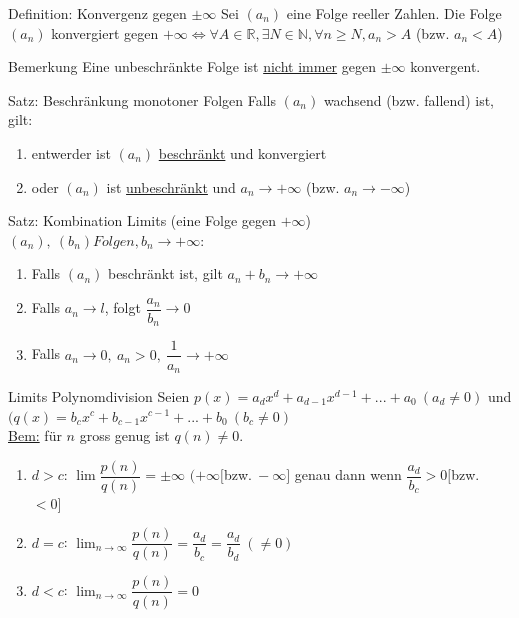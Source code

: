 \documentclass[a4paper,10pt]{article}
\begin{document}
\begin{defbox}
    {Definition: Konvergenz gegen $\pm\infty$}
    Sei $(a_n)$ eine Folge reeller Zahlen. Die Folge $(a_n)$ konvergiert gegen $+\infty \iff \forall A\in \mathbb R, \exists N \in \mathbb N, \forall n \ge N, a_n > A$ (bzw. $a_n<A$)
\end{defbox}
\begin{bembox}
    {Bemerkung}
    Eine unbeschränkte Folge ist \underline{nicht immer} gegen $\pm\infty$ konvergent.
\end{bembox}
\begin{tbox}
    {Satz: Beschränkung monotoner Folgen}
    Falls $(a_n)$ wachsend (bzw. fallend) ist, gilt:
    \begin{enumerate}
        \item entwerder ist $(a_n)$ \underline{beschränkt} und konvergiert
        \item oder $(a_n)$ ist \underline{unbeschränkt} und $a_n\longrightarrow+\infty$ (bzw. $a_n\longrightarrow -\infty$)
    \end{enumerate}
\end{tbox}
\begin{tbox}
    {Satz: Kombination Limits (eine Folge gegen $+\infty$)}
    $(a_n),\ (b_n) Folgen, b_n \longrightarrow+\infty:$
    \begin{enumerate}
        \item Falls $(a_n)$ beschränkt ist, gilt $a_n+ b_n \longrightarrow+\infty$
        \item Falls $a_n\longrightarrow l$, folgt $\dfrac{a_n}{b_n}\longrightarrow 0$
        \item Falls $a_n\longrightarrow 0, \ a_n >0, \ \dfrac{1}{a_n}\longrightarrow +\infty$
    \end{enumerate}
\end{tbox}
\begin{tipbox}
    {Limits Polynomdivision}
    Seien $p(x)=a_dx^d+a_{d-1}x^{d-1}+...+a_0\ (a_d\neq 0)$ und $(q(x)=b_cx^c+b_{c-1}x^{c-1}+...+b_0\ (b_c\neq 0)$ 
    \\\underline{Bem:} für $n$ gross genug ist $q(n)\neq 0$.
    \begin{enumerate}
        \item $d>c$: $\lim \dfrac{p(n)}{q(n)}=\pm \infty$ $(+\infty[$bzw.$\ -\infty] $ genau dann wenn $\dfrac{a_d}{b_c}>0[$bzw. $<0]$
        \item $d=c$: $\lim_{n\to \infty} \dfrac{p(n)}{q(n)}=\dfrac{a_d}{b_c}=\dfrac{a_d}{b_d}\ (\neq 0)$
        \item $d<c$: $\lim_{n\to \infty}\dfrac{p(n)}{q(n)}=0$
    \end{enumerate}
\end{tipbox}
\end{document}

